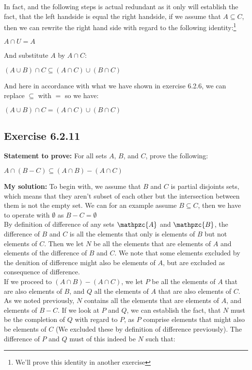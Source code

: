 \documentclass{article}
\newcommand{\cent}[1]{\begin{center}#1\end{center}}
\newcommand{\script}[1]{\mathpzc{#1}}
\newcommand{\Prove}{\textbf{Statement to prove: }}
\newcommand{\Solution}{\textbf{My solution: }}
\newcommand{\QED}{\boxed{}}
\newcommand{\Exercise}[1]{\subsection{Exercise #1}}
\begin{document}
	In fact, and the following steps is actual  redundant as it only will establish the fact, that the left handside is equal the right handside, if we assume that  $A \subseteq C$, then we can rewrite the right hand side with regard to the following identity:\footnote{We'll prove this identity in another exercise}
	
	\cent{$A \cap U = A$}
	
	And substitute $A$ by $A \cap C$:
	
	\cent{$(A \cup B) \cap C \subseteq (A \cap C) \cup (B \cap C)$}
	
	And here in accordance with what we have shown in exercise 6.2.6,  we can replace $\subseteq$ with $=$ so we have:
	\cent{$(A \cup B) \cap C = (A \cap C) \cup (B \cap C)$}
	\QED
	
	\Exercise{6.2.11}
	
	\Prove
	For all sets $A$, $B$, and $C$, prove the following:
	
	\cent{$ A \cap (B-C) \subseteq (A \cap B) - (A \cap C) $}
	
	\Solution
	To begin with, we assume that $B$ and $C$ is partial disjoints sets, which means that they aren't subset of each other but the intersection between them is not the empty set. We can for an example assume $B \subseteq C$, then we have to operate with $\emptyset$ as $B - C = \emptyset$\\
	
	By definition of difference of any sets $\script{A}$ and $ \script{B} $, the difference of $B$ and $C$ is all the elements that only is elements of $B$ but not elements of $C$. Then we let $N$ be all the elements that are elements of $A$ and elements of the difference of $B$ and $C$. We note that some elements excluded by the denition of difference might also be elements of $A$, but are excluded as consequence of difference.\\
	
	If we proceed to $(A \cap B) - (A \cap C)$, we let $P$ be all the elements of $A$ that are also elements of $B$, and $Q$ all the elements of $A$ that are also elements of $C$. As we noted previously, $N$ contains all the elements that are elements of $A$, and elements of $B -C$. If we look at $P$ and $Q$, we can establish the fact, that $N$ must be the completion of $Q$ with regard to $P$, as $P$ comprise elements that might also be elements of $C$ (We excluded these by definition of difference previously). The difference of $P$ and $Q$ must of this indeed be $N$ such that:
	
\end{document}
